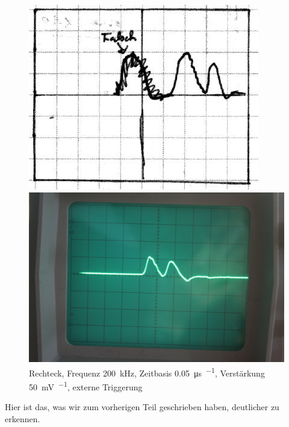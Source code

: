 \begin{figure}[htbp]
	\centering
	\begin{minipage}{.45\linewidth}
	\includegraphics[width=\linewidth]{Skizzen/IMG_0766-1500.jpg}
	\end{minipage}
	\hfill
	\begin{minipage}{.45\linewidth}
	\includegraphics[width=\linewidth]{Fotos/IMG_0766-1500.jpg}
	\end{minipage}
	\caption{%
		Rechteck, Frequenz \SI{200}{\kilo\hertz},
		Zeitbasis \SI{.05}{\micro\second\per\division},
		Verstärkung \SI{50}{\milli\volt\per\division},
		externe Triggerung
	}
	\label{fig:0766}
\end{figure}

Hier ist das, was wir zum vorherigen Teil geschrieben haben, deutlicher zu
erkennen.

